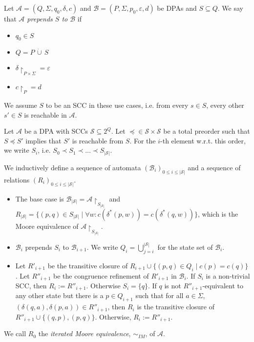 \begin{defn}
	Let $\mathcal{A} = (Q, \Sigma, q_0, \delta, c)$ and $\mathcal{B} = (P, \Sigma, p_0, \varepsilon, d)$ be DPAs and $S \subseteq Q$. We say that \emph{$\mathcal{A}$ prepends $S$ to $\mathcal{B}$} if 
	\begin{itemize}
		\item $q_0 \in S$
		\item $Q = P \,\dot{\cup}\, S$
		\item $\delta\upharpoonright_{P \times \Sigma} = \varepsilon$
		\item $c\upharpoonright_P = d$
	\end{itemize}
	
	We assume $S$ to be an SCC in these use cases, i.e. from every $s \in S$, every other $s' \in S$ is reachable in $\mathcal{A}$.
\end{defn} 

\begin{defn}
\label{def:fwe:itmoore}
	Let $\mathcal{A}$ be a DPA with SCCs $\mathcal{S} \subseteq 2^Q$. Let $\preceq \in \mathcal{S} \times \mathcal{S}$ be a total preorder such that $S \preceq S'$ implies that $S'$ is reachable from $S$. For the $i$-th element w.r.t. this order, we write $S_i$, i.e. $S_0 \prec S_1 \prec \dots \prec S_{|\mathcal{S}|}$.
	
	We inductively define a sequence of automata $(\mathcal{B}_i)_{0 \leq i \leq |\mathcal{S}|}$ and a sequence of relations $(R_i)_{0 \leq i \leq |\mathcal{S}|}$. 
	
	\begin{itemize}
		\item The base case is $\mathcal{B}_{|\mathcal{S}|} = \mathcal{A}\upharpoonright_{S_{|\mathcal{S}|}}$ and $R_{|\mathcal{S}|} = \{ (p, q) \in S_{|\mathcal{S}|} \mid \forall w: c(\delta^*(p, w)) = c(\delta^*(q, w))\}$, which is the Moore equivalence of $\mathcal{A}\upharpoonright_{S_{|\mathcal{S}|}}$.
		\item $\mathcal{B}_i$ prepends $S_i$ to $\mathcal{B}_{i+1}$. We write $Q_i = \bigcup_{j=i}^{|\mathcal{S}|}$ for the state set of $\mathcal{B}_i$.
		\item Let $R'_{i+1}$ be the transitive closure of $R_{i+1} \cup \{ (p, q) \in Q_i \mid c(p) = c(q)\}$. Let $R''_{i+1}$ be the congruence refinement of $R'_{i+1}$ in $\mathcal{B}_i$. If $S_i$ is a non-trivial SCC, then $R_i := R''_{i+1}$. Otherwise $S_i = \{q\}$. If $q$ is not $R''_{i+1}$-equivalent to any other state but there is a $p \in Q_{i+1}$ such that for all $a \in \Sigma$, $(\delta(q, a), \delta(p, a)) \in R''_{i+1}$, then $R_i$ is the transitive closure of $R''_{i+1} \cup \{(q, p), (p, q)\}$. Otherwise, $R_i := R''_{i+1}$.
	\end{itemize} 
	
	We call $R_0$ the \emph{iterated Moore equivalence}, $\sim_{IM}$, of $\mathcal{A}$.
\end{defn}

